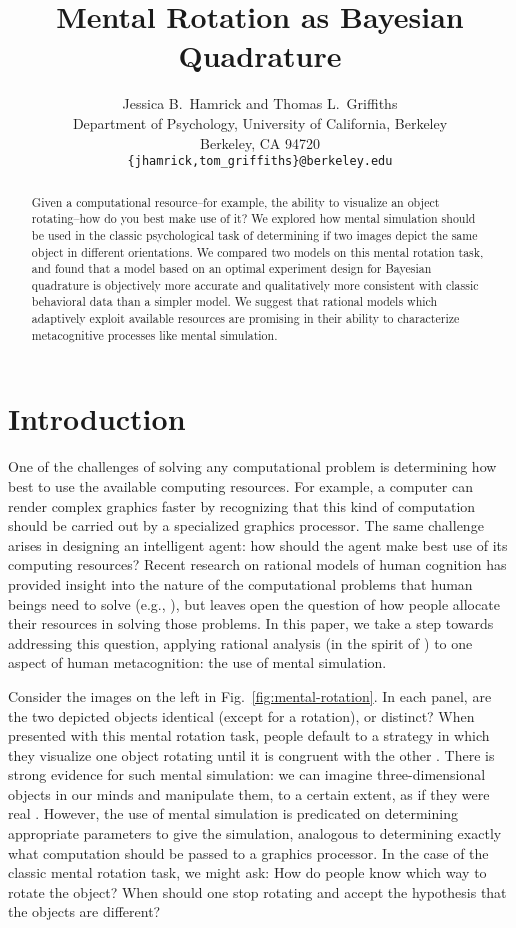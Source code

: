 \documentclass{article} %
\title{Mental Rotation as Bayesian Quadrature}
\author{Jessica B.~Hamrick and Thomas L.~Griffiths\\
  Department of Psychology, University of California, Berkeley\\
  Berkeley, CA 94720\\
  \texttt{\{jhamrick,tom\_griffiths\}@berkeley.edu}}
\begin{document}
\maketitle

\begin{abstract}
  Given a computational resource--for example, the ability to
  visualize an object rotating--how do you best make use of it? We
  explored how mental simulation should be used in the classic
  psychological task of determining if two images depict the same
  object in different orientations. We compared two models on this
  mental rotation task, and found that a model based on an optimal
  experiment design for Bayesian quadrature is objectively more
  accurate and qualitatively more consistent with classic behavioral
  data than a simpler model. We suggest that rational models which
  adaptively exploit available resources are promising in their
  ability to characterize metacognitive processes like mental
  simulation.
\end{abstract}

\section{Introduction}

One of the challenges of solving any computational problem is
determining how best to use the available computing resources. For
example, a computer can render complex graphics faster by recognizing
that this kind of computation should be carried out by a specialized
graphics processor. The same challenge arises in designing an
intelligent agent: how should the agent make best use of its computing
resources? Recent research on rational models of human cognition has
provided insight into the nature of the computational problems that
human beings need to solve (e.g., \cite{Chater:1999wp,tenenbaumkgg11}),
but leaves open the question of how people allocate their resources in
solving those problems. In this paper, we take a step towards
addressing this question, applying rational analysis (in the spirit of
\cite{Marr:1983to,anderson90,Shepard:1987tt}) to one aspect of human
metacognition: the use of mental simulation.

Consider the images on the left in Fig.~\ref{fig:mental-rotation}. In
each panel, are the two depicted objects identical (except for a
rotation), or distinct? When presented with this mental rotation task,
people default to a strategy in which they visualize one object
rotating until it is congruent with the other
\cite{Shepard1971}. There is strong evidence for such mental
simulation: we can imagine three-dimensional objects in our minds and
manipulate them, to a certain extent, as if they were real
\cite{Kosslyn:2009tj}.  However, the use of mental simulation is
predicated on determining appropriate parameters to give the
simulation, analogous to determining exactly what computation should
be passed to a graphics processor.  In the case of the classic mental
rotation task, we might ask: How do people know which way to rotate
the object?  When should one stop rotating and accept the hypothesis
that the objects are different?
\end{document}
